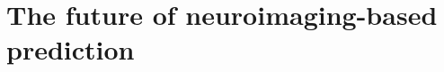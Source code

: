 \documentclass[10pt]{beamer}
\def\summaryinneritems{-0.3em}
\def\summaryinnertop{-0.5em}
\begin{document}

    \section{The future of neuroimaging-based prediction}
\end{document}
